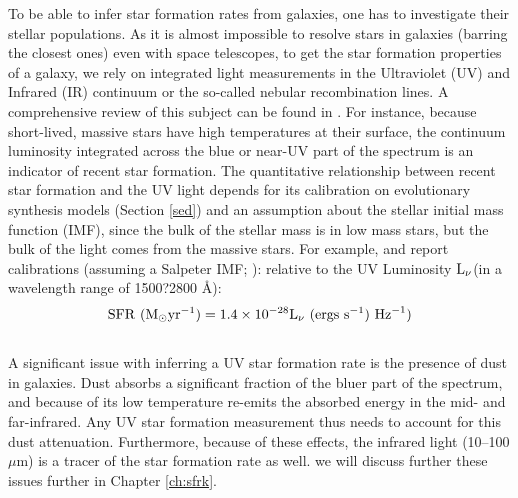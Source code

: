To be able to infer star formation rates from galaxies, one has to
investigate their stellar populations. As it is almost impossible to
resolve stars in galaxies (barring the closest ones) even with space
telescopes, to get the star formation properties of a galaxy, we rely
on integrated light measurements in the Ultraviolet (UV) and Infrared
(IR) continuum or the so-called nebular recombination lines. A
comprehensive review of this subject can be found in
\citet{kennicutt_star_2012}. For instance, because short-lived,
massive stars have high temperatures at their surface, the continuum
luminosity integrated across the blue or near-UV part of the spectrum
is an indicator of recent star formation.  The quantitative
relationship between recent star formation and the UV light depends
for its calibration on evolutionary synthesis models (Section
\ref{sed}) and an assumption about the stellar initial mass function
(IMF), since the bulk of the stellar mass is in low mass stars, but
the bulk of the light comes from the massive stars. For example,
\citet{1998ApJ...498..106M} and \citet{kennicutt_star_2012} report
calibrations (assuming a Salpeter IMF; \citealt{1955ApJ...121..161S}):
relative to the UV Luminosity ${\rm L}_{\nu}$(in a wavelength range of
1500?2800 \AA):
$${\rm SFR}\hbox{ }({\rm M}_{\odot} {\rm yr}^{-1}) = 1.4 \times 10^{-28} {\rm L}_{\nu} \hbox{ }({\rm ergs }\hbox{ } {\rm s}^{-1})\hbox{ } {\rm Hz}^{-1})$$\\

A significant issue with inferring a UV star formation rate is the
presence of dust in galaxies. Dust absorbs a significant fraction of
the bluer part of the spectrum, and because of its low temperature
re-emits the absorbed energy in the mid- and far-infrared. Any UV star
formation measurement thus needs to account for this dust
attenuation. Furthermore, because of these effects, the infrared light
(10--100 $\mu$m) is a tracer of the star formation rate as well.  we
will discuss further these issues further in Chapter \ref{ch:sfrk}.

